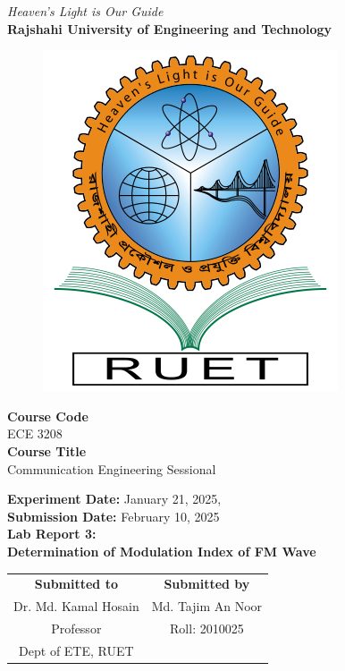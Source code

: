 \vspace*{\fill}
\begin{center}

    \emph{Heaven's Light is Our Guide} \\
    \textbf{Rajshahi University of Engineering and Technology} \\

    \begin{figure}[H]
        \centering
        \includegraphics[scale=.34]{images/RUET_logo.png}
        \label{fig:ruet_logo}
    \end{figure}
    \vspace{5mm}

    \textbf{Course Code}\\
    ECE 3208\\
    \vspace{3mm}
    \textbf{Course Title}\\
    Communication Engineering Sessional

    \vspace{5mm}
    \textbf{Experiment Date:} {January 21, 2025},\\
    \textbf{Submission Date:} {February 10, 2025}\\

    \vspace{5mm}
    \textbf{Lab Report 3: \\
        Determination of Modulation Index of FM Wave}

    \vspace{15mm}

    \begin{tabular}{c|c}
        \textbf{Submitted to} & \textbf{Submitted by} \\
        Dr. Md. Kamal Hosain  & Md. Tajim An Noor     \\
        Professor             & Roll: 2010025         \\
        Dept of ETE, RUET     &                       \\
    \end{tabular}

\end{center}
\vspace*{\fill}
